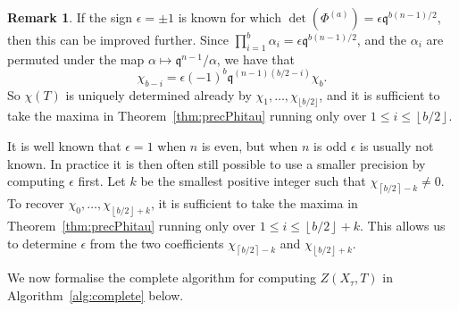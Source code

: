 \documentclass[a4paper,11pt]{article}
\numberwithin{equation}{section}
\providecommand{\floor}[1]{\left\lfloor#1\right\rfloor}   %
\providecommand{\ceil}[1]{\left\lceil#1\right\rceil}   %
\theoremstyle{definition}
\newtheorem{rem}[thm]{Remark}
\begin{document}
\begin{rem}
If the sign $\epsilon = \pm 1$ is known for which 
$\det(\Phi^{(a)}) = \epsilon \mathfrak{q}^{b(n-1)/2}$, then this can 
be improved further. Since 
$\prod_{i=1}^b \alpha_i = \epsilon \mathfrak{q}^{b(n-1)/2}$, and 
the $\alpha_i$ are permuted under the map 
$\alpha \mapsto \mathfrak{q}^{n-1}/\alpha$, we have that
\begin{equation*}
\chi_{b-i}=\epsilon (-1)^{b} \mathfrak{q}^{(n-1)(b/2-i)} \chi_b. 
\end{equation*}
So $\chi(T)$ is uniquely determined already by 
$\chi_1,\dotsc,\chi_{\lfloor b/2 \rfloor}$, and it is sufficient 
to take the maxima in Theorem~\ref{thm:precPhitau} running only over 
$1 \leq i \leq \floor{b/2}$.

It is well known that $\epsilon = 1$ when $n$ is even, but when $n$ 
is odd $\epsilon$ is usually not known. In practice it is then often 
still possible to use a smaller precision by computing $\epsilon$ first. 
Let $k$ be the smallest positive integer such that $\chi_{\ceil{b/2} - k} \neq 0$. 
To recover $\chi_0, \dotsc, \chi_{\floor{b/2}+k}$, it is sufficient to take 
the maxima in Theorem~\ref{thm:precPhitau} running only over 
$1 \leq i \leq \floor{b/2}+k$. This allows us to determine $\epsilon$ from 
the two coefficients $\chi_{\ceil{b/2}-k}$ and $\chi_{\floor{b/2}+k}$. 
\end{rem}

We now formalise the complete algorithm for computing $Z(X_{\tau},T)$ 
in Algorithm~\ref{alg:complete} below.
\end{document}
